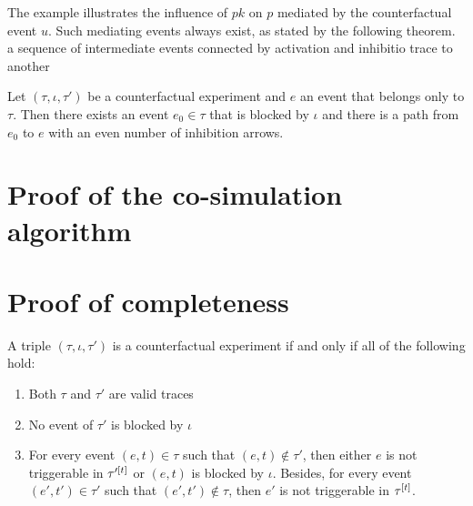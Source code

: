 The example illustrates the influence of $pk$ on $p$ mediated by the
counterfactual event $u$. Such mediating events always exist, as
stated by the following theorem.  %
a sequence of intermediate events connected by activation and
inhibitio%
trace to another %

\begin{theorem} Let $(\tau, \iota, \tau')$ be a counterfactual
  experiment and $e$ an event that belongs only to $\tau$. Then there
  exists an event $e_0 \in \tau$ that is blocked by $\iota$ and there
  is a path from $e_0$ to $e$ with an even number of inhibition
  arrows.
\end{theorem}


\section{Proof of the co-simulation algorithm}



\section{Proof of completeness}

\begin{proposition}%
  \label{prop:valid-cex}
  A triple $(\tau, \iota, \tau')$ is a counterfactual experiment if
  and only if all of the following hold:
  \begin{enumerate}[leftmargin=1.3cm, label=\textbf{VC\arabic*.}]
  \item \label{valid-cex:valid-traces} Both $\tau$ and $\tau'$ are
    valid traces
  \item \label{valid-cex:no-blocking} No event of $\tau'$ is blocked
    by $\iota$
  \item \label{valid-cex:co-occur} For every event $(e, t) \in \tau$
    such that $(e, t) \notin \tau'$, then either $e$ is not
    triggerable in $\TSTATE{t}{\tau'}$ or $(e, t)$ is blocked by
    $\iota$.  Besides, for every event $(e', t') \in \tau'$ such that
    $(e', t') \notin \tau$, then $e'$ is not triggerable in
    $\TSTATE{t}{\tau}$.

  \end{enumerate}
\end{proposition}

